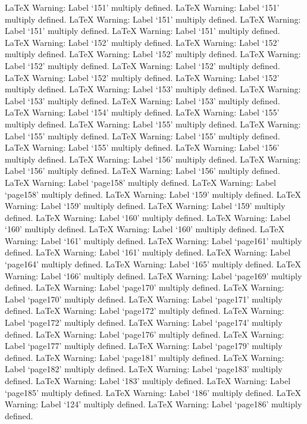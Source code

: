 LaTeX Warning: Label `151' multiply defined.
LaTeX Warning: Label `151' multiply defined.
LaTeX Warning: Label `151' multiply defined.
LaTeX Warning: Label `151' multiply defined.
LaTeX Warning: Label `151' multiply defined.
LaTeX Warning: Label `152' multiply defined.
LaTeX Warning: Label `152' multiply defined.
LaTeX Warning: Label `152' multiply defined.
LaTeX Warning: Label `152' multiply defined.
LaTeX Warning: Label `152' multiply defined.
LaTeX Warning: Label `152' multiply defined.
LaTeX Warning: Label `152' multiply defined.
LaTeX Warning: Label `153' multiply defined.
LaTeX Warning: Label `153' multiply defined.
LaTeX Warning: Label `153' multiply defined.
LaTeX Warning: Label `154' multiply defined.
LaTeX Warning: Label `155' multiply defined.
LaTeX Warning: Label `155' multiply defined.
LaTeX Warning: Label `155' multiply defined.
LaTeX Warning: Label `155' multiply defined.
LaTeX Warning: Label `155' multiply defined.
LaTeX Warning: Label `156' multiply defined.
LaTeX Warning: Label `156' multiply defined.
LaTeX Warning: Label `156' multiply defined.
LaTeX Warning: Label `156' multiply defined.
LaTeX Warning: Label `page158' multiply defined.
LaTeX Warning: Label `page158' multiply defined.
LaTeX Warning: Label `159' multiply defined.
LaTeX Warning: Label `159' multiply defined.
LaTeX Warning: Label `159' multiply defined.
LaTeX Warning: Label `160' multiply defined.
LaTeX Warning: Label `160' multiply defined.
LaTeX Warning: Label `160' multiply defined.
LaTeX Warning: Label `161' multiply defined.
LaTeX Warning: Label `page161' multiply defined.
LaTeX Warning: Label `161' multiply defined.
LaTeX Warning: Label `page164' multiply defined.
LaTeX Warning: Label `165' multiply defined.
LaTeX Warning: Label `166' multiply defined.
LaTeX Warning: Label `page169' multiply defined.
LaTeX Warning: Label `page170' multiply defined.
LaTeX Warning: Label `page170' multiply defined.
LaTeX Warning: Label `page171' multiply defined.
LaTeX Warning: Label `page172' multiply defined.
LaTeX Warning: Label `page172' multiply defined.
LaTeX Warning: Label `page174' multiply defined.
LaTeX Warning: Label `page176' multiply defined.
LaTeX Warning: Label `page177' multiply defined.
LaTeX Warning: Label `page179' multiply defined.
LaTeX Warning: Label `page181' multiply defined.
LaTeX Warning: Label `page182' multiply defined.
LaTeX Warning: Label `page183' multiply defined.
LaTeX Warning: Label `183' multiply defined.
LaTeX Warning: Label `page185' multiply defined.
LaTeX Warning: Label `186' multiply defined.
LaTeX Warning: Label `124' multiply defined.
LaTeX Warning: Label `page186' multiply defined.
